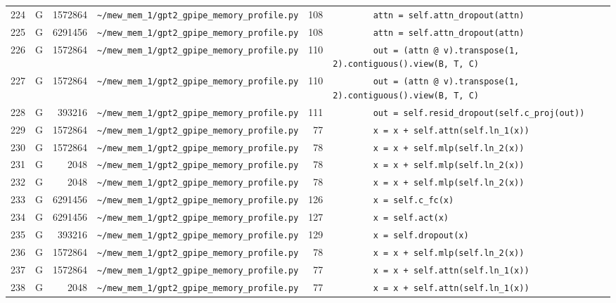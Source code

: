 \documentclass{article}
\begin{document}
\begin{longtable}{r l r p{6.5cm} r p{7.0cm}}
224 & G & 1572864 & \lstinline|~/mew_mem_1/gpt2_gpipe_memory_profile.py| & 108 & \lstinline|        attn = self.attn_dropout(attn)| \\
225 & G & 6291456 & \lstinline|~/mew_mem_1/gpt2_gpipe_memory_profile.py| & 108 & \lstinline|        attn = self.attn_dropout(attn)| \\
226 & G & 1572864 & \lstinline|~/mew_mem_1/gpt2_gpipe_memory_profile.py| & 110 & \lstinline|        out = (attn @ v).transpose(1, 2).contiguous().view(B, T, C)| \\
227 & G & 1572864 & \lstinline|~/mew_mem_1/gpt2_gpipe_memory_profile.py| & 110 & \lstinline|        out = (attn @ v).transpose(1, 2).contiguous().view(B, T, C)| \\
228 & G & 393216 & \lstinline|~/mew_mem_1/gpt2_gpipe_memory_profile.py| & 111 & \lstinline|        out = self.resid_dropout(self.c_proj(out))| \\
229 & G & 1572864 & \lstinline|~/mew_mem_1/gpt2_gpipe_memory_profile.py| & 77 & \lstinline|        x = x + self.attn(self.ln_1(x))| \\
230 & G & 1572864 & \lstinline|~/mew_mem_1/gpt2_gpipe_memory_profile.py| & 78 & \lstinline|        x = x + self.mlp(self.ln_2(x))| \\
231 & G & 2048 & \lstinline|~/mew_mem_1/gpt2_gpipe_memory_profile.py| & 78 & \lstinline|        x = x + self.mlp(self.ln_2(x))| \\
232 & G & 2048 & \lstinline|~/mew_mem_1/gpt2_gpipe_memory_profile.py| & 78 & \lstinline|        x = x + self.mlp(self.ln_2(x))| \\
233 & G & 6291456 & \lstinline|~/mew_mem_1/gpt2_gpipe_memory_profile.py| & 126 & \lstinline|        x = self.c_fc(x)| \\
234 & G & 6291456 & \lstinline|~/mew_mem_1/gpt2_gpipe_memory_profile.py| & 127 & \lstinline|        x = self.act(x)| \\
235 & G & 393216 & \lstinline|~/mew_mem_1/gpt2_gpipe_memory_profile.py| & 129 & \lstinline|        x = self.dropout(x)| \\
236 & G & 1572864 & \lstinline|~/mew_mem_1/gpt2_gpipe_memory_profile.py| & 78 & \lstinline|        x = x + self.mlp(self.ln_2(x))| \\
237 & G & 1572864 & \lstinline|~/mew_mem_1/gpt2_gpipe_memory_profile.py| & 77 & \lstinline|        x = x + self.attn(self.ln_1(x))| \\
238 & G & 2048 & \lstinline|~/mew_mem_1/gpt2_gpipe_memory_profile.py| & 77 & \lstinline|        x = x + self.attn(self.ln_1(x))| \\

\end{longtable}
\end{document}
